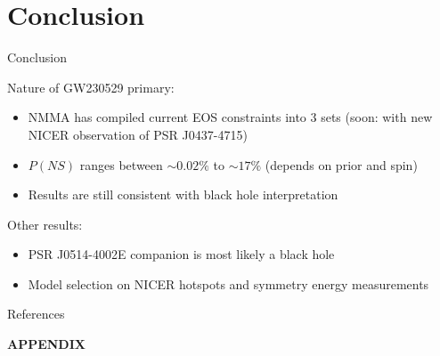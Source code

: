 \documentclass[usenames,dvipsnames,t]{beamer}
\begin{document}
\section{Conclusion}

\begin{frame}{Conclusion}

  \def\x{3mm}
  \def\y{4mm}

  Nature of GW230529 primary:
  \begin{itemize}
    \vspace{\x}
    \item \textsc{NMMA} has compiled current EOS constraints into 3 sets (soon: with new NICER observation of PSR J0437-4715)

    \vspace{\x}

    \item $P(NS)$ ranges between $\sim 0.02\%$ to $\sim 17\%$ (depends on prior and spin)
    
    \vspace{\x}

    \item Results are still consistent with black hole interpretation
  \end{itemize}

  \vspace{\y}

  Other results:
  \begin{itemize}

    \vspace{\x}
    \item PSR J0514-4002E companion is most likely a black hole

    \vspace{\x}

    \item Model selection on NICER hotspots and symmetry energy measurements
  \end{itemize}
  
\end{frame}

\begin{frame}[allowframebreaks]{References}

\printbibliography
    
\end{frame}


\appendix

\begin{frame}
\vfill
\centering
\textbf{APPENDIX}
\vfill
\end{frame}
\end{document}
